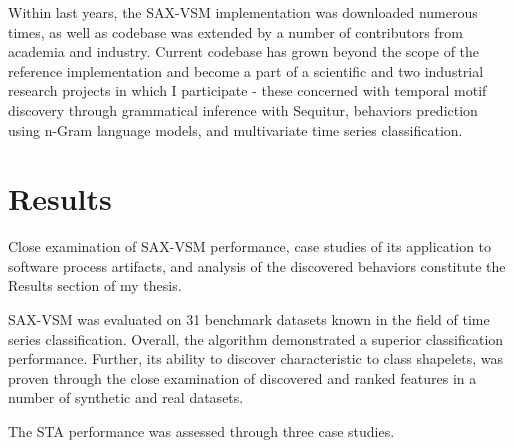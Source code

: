 \documentclass[12pt,oneside]{article}
\numberwithin{equation}{subsection}
\begin{document}
Within last years, the SAX-VSM implementation was downloaded numerous times, as well as codebase
was extended by a number of contributors from academia and industry. Current codebase has grown
beyond the scope of the reference implementation and become a part of a scientific and two
industrial research projects in which I participate - these concerned with temporal motif discovery
through grammatical inference with Sequitur, behaviors prediction using n-Gram language models, and
multivariate time series classification.

\section{Results}
Close examination of SAX-VSM performance, case studies of its application to software process
artifacts, and analysis of the discovered behaviors constitute the Results section of my thesis.

SAX-VSM was evaluated on 31 benchmark datasets known in the field of time series classification.
Overall, the algorithm demonstrated a superior classification performance. Further, its ability to
discover characteristic to class shapelets, was proven through the close examination of discovered
and ranked features in a number of synthetic and real datasets.

The STA performance was assessed through three case studies.






%
%
\end{document}
